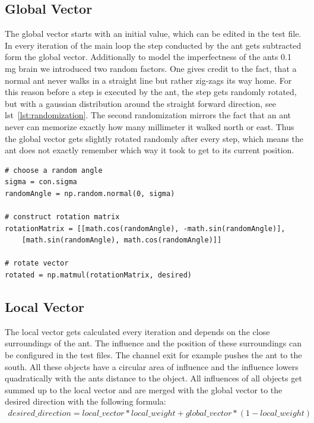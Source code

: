 \documentclass[11pt]{article}
\begin{document}
	\subsection{Global Vector}
		The global vector starts with an initial value, which can be edited in the test file. In every iteration of the main loop the step conducted by the ant gets subtracted form the global vector. Additionally to model the imperfectness of the ants 0.1 mg brain we introduced two random factors. One gives credit to the fact, that a normal ant never walks in a straight line but rather zig-zags its way home. For this reason before a step is executed by the ant, the step gets randomly rotated, but with a gaussian distribution around the straight forward direction, see lst~\vref{lst:randomization}. The second randomization mirrors the fact that an ant never can memorize exactly how many millimeter it walked north or east. Thus the global vector gets slightly rotated randomly after every step, which means the ant does not exactly remember which way it took to get to its current position.
		
		
		
\begin{lstlisting}[caption={Randomization of desired step},label=lst:randomization]
# choose a random angle
sigma = con.sigma
randomAngle = np.random.normal(0, sigma)

# construct rotation matrix
rotationMatrix = [[math.cos(randomAngle), -math.sin(randomAngle)],
	[math.sin(randomAngle), math.cos(randomAngle)]]

# rotate vector
rotated = np.matmul(rotationMatrix, desired)
\end{lstlisting}

	\subsection{Local Vector}
		The local vector gets calculated every iteration and depends on the close surroundings of the ant. The influence and the position of these surroundings can be configured in the test files. The channel exit for example pushes the ant to the south. All these objects have a circular area of influence and the influence lowers quadratically with the ants distance to the object. All influences of all objects get summed up to the local vector and are merged with the global vector to the desired direction with the following formula:
		\begin{align*}
			desired\_direction = local\_vector * local\_weight + global\_vector * (1-local\_weight)
		\end{align*}
\end{document}
